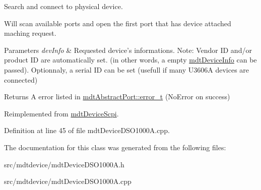 Search and connect to physical device. 

Will scan available ports and open the first port that has device attached maching request.


\begin{DoxyParams}{Parameters}
{\em devInfo} & Requested device's informations. Note: Vendor ID and/or product ID are automatically set. (in other words, a empty \hyperlink{classmdt_device_info}{mdtDeviceInfo} can be passed). Optionnaly, a serial ID can be set (usefull if many U3606A devices are connected) \\
\hline
\end{DoxyParams}
\begin{DoxyReturn}{Returns}
A error listed in \hyperlink{classmdt_abstract_port_ad4121bb930c95887e77f8bafa065a85e}{mdtAbstractPort::error\_\-t} (NoError on success) 
\end{DoxyReturn}


Reimplemented from \hyperlink{classmdt_device_scpi_ae8e886b362cbf9d1bf7064b48348b8e8}{mdtDeviceScpi}.



Definition at line 45 of file mdtDeviceDSO1000A.cpp.



The documentation for this class was generated from the following files:\begin{DoxyCompactItemize}
\item 
src/mdtdevice/mdtDeviceDSO1000A.h\item 
src/mdtdevice/mdtDeviceDSO1000A.cpp\end{DoxyCompactItemize}
